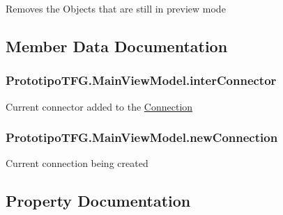 Removes the Objects that are still in preview mode 



\subsection{Member Data Documentation}
\hypertarget{class_prototipo_t_f_g_1_1_main_view_model_a8d14855d3cd1bc0589754f52ca171fc8}{}
\subsubsection[{inter\+Connector}]{ Prototipo\+T\+F\+G.\+Main\+View\+Model.\+inter\+Connector}\label{class_prototipo_t_f_g_1_1_main_view_model_a8d14855d3cd1bc0589754f52ca171fc8}


Current connector added to the \hyperlink{class_prototipo_t_f_g_1_1_connection}{Connection} 

\hypertarget{class_prototipo_t_f_g_1_1_main_view_model_ad831b48de3245d6140e793b139248766}{}
\subsubsection[{new\+Connection}]{ Prototipo\+T\+F\+G.\+Main\+View\+Model.\+new\+Connection}\label{class_prototipo_t_f_g_1_1_main_view_model_ad831b48de3245d6140e793b139248766}


Current connection being created 



\subsection{Property Documentation}
\hypertarget{class_prototipo_t_f_g_1_1_main_view_model_a0668d75bbef450ad264cedb36afa3f0a}{}
